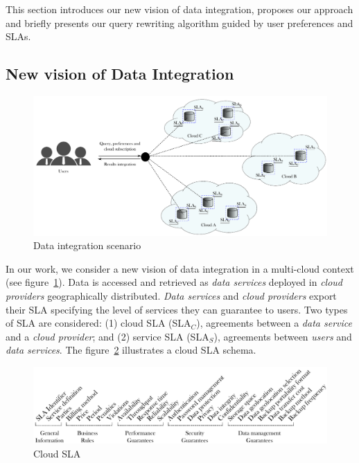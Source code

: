 This section introduces our new vision of data integration, proposes our approach and briefly presents our query rewriting algorithm guided by user preferences and SLAs.

\subsection{New vision of Data Integration}

\begin{figure}[th!]
\center
\includegraphics[scale=0.40]{scenario.pdf}
\caption{Data integration scenario}\label{fig:scenario}
\end{figure}

In our work, we consider a new vision of data integration in a multi-cloud context (see figure~\ref{fig:scenario}). Data is accessed and retrieved as \textit{data services} deployed in \textit{cloud providers} geographically distributed. \textit{Data services} and \textit{cloud providers} export their SLA specifying the level of services they can guarantee to users. Two types of SLA are considered: (1) cloud SLA (SLA$_{C}$), agreements between a \textit{data service} and a \textit{cloud provider}; and (2) service SLA (SLA$_{S}$), agreements between \textit{users} and \textit{data services}. The figure~\ref{fig:cloudsla} illustrates a cloud SLA schema.  

\begin{figure}[th!]
\center
\includegraphics[scale=0.57]{Cloud_SLA.pdf}
\caption{Cloud SLA}\label{fig:cloudsla}
\end{figure}

